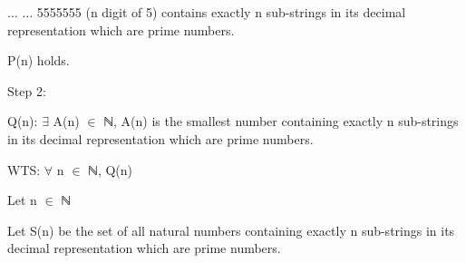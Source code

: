 \documentclass[12pt]{article}
\renewcommand{\_}{\kern-1.5pt\textunderscore\kern-1.5pt}
\begin{document}
\begin{enumerate}
\begin{enumerate}
\begin{FlushLeft}
{\fontsize{14pt}{16.8pt}$ \ldots $ $ \ldots $ 5555555 (n digit of 5) contains exactly n sub-strings in its decimal representation which are prime numbers.\par}
\end{FlushLeft}\par

\begin{FlushLeft}
{\fontsize{14pt}{16.8pt}\selectfont P(n) holds.\par}
\end{FlushLeft}\par

\begin{FlushLeft}
\end{FlushLeft}\par

\tab 
\vspace{\baselineskip}\begin{FlushLeft}
{\fontsize{14pt}{16.8pt}\selectfont \tab Step 2: \par}
\end{FlushLeft}\par

\begin{FlushLeft}
{\fontsize{14pt}{16.8pt}\selectfont Q(n): $ \exists $  A(n) $ \in $  ℕ, A(n) is the smallest number containing exactly n sub-strings in its decimal representation which are prime numbers.\par}
\end{FlushLeft}\par

\begin{FlushLeft}
{\fontsize{14pt}{16.8pt}\selectfont WTS: $ \forall $  n $ \in $  ℕ, Q(n)\par}
\end{FlushLeft}\par

\begin{FlushLeft}
{\fontsize{14pt}{16.8pt}\selectfont Let n $ \in $  ℕ\par}
\end{FlushLeft}\par


\vspace{\baselineskip}
\begin{FlushLeft}
{\fontsize{14pt}{16.8pt}\selectfont Let S(n) be the set of all natural numbers containing exactly n sub-strings in its decimal representation which are prime numbers.\par}
\end{FlushLeft}\par


\end{enumerate}
\end{enumerate}
\end{document}
